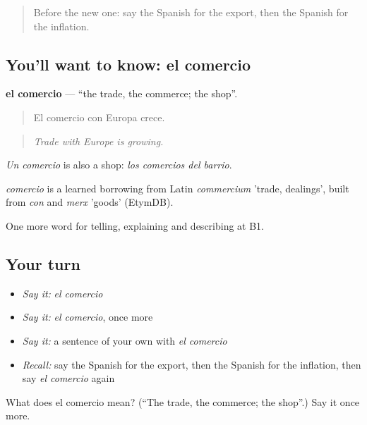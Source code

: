 \label{lesson:ES-C630-comercio}



\begin{quote}
Before the new one: say the Spanish for the export, then the Spanish for the inflation.
\end{quote}

\subsection*{You'll want to know: el comercio}
\textbf{el comercio} — \textquotedblleft{}the trade, the commerce; the shop\textquotedblright{}.

\begin{quote}
El comercio con Europa crece.
\end{quote}

\begin{quote}
\emph{Trade with Europe is growing.}
\end{quote}

\emph{Un comercio} is also a shop: \emph{los comercios del barrio}.

\begin{cousinweb}
\emph{comercio} is a learned borrowing from Latin \emph{commercium} 'trade, dealings', built from \emph{con} and \emph{merx} 'goods' (EtymDB).
\end{cousinweb}

\begin{grammarlens}[title={What you've built}]
One more word for telling, explaining and describing at B1.
\end{grammarlens}

\subsection*{Your turn}
\begin{itemize}
\raggedright
  \item \emph{Say it:} \emph{el comercio}
  \item \emph{Say it:} \emph{el comercio}, once more
  \item \emph{Say it:} a sentence of your own with \emph{el comercio}
  \item \emph{Recall:} say the Spanish for the export, then the Spanish for the inflation, then say \emph{el comercio} again
\end{itemize}

\begin{tcolorbox}[breakable,colback=teal!4,colframe=teal!35!black,title={Before you move on}]
What does el comercio mean? (\textquotedblleft{}The trade, the commerce; the shop\textquotedblright{}.) Say it once more.
\end{tcolorbox}
